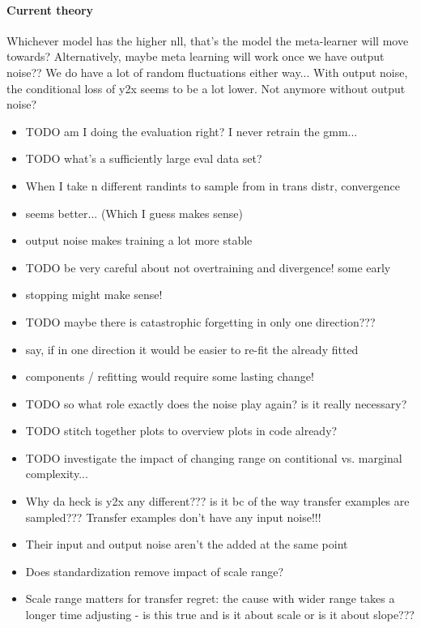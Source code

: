 \documentclass{article}
\begin{document}
\paragraph{Current theory}
Whichever model has the higher nll, that's the model the meta-learner will move towards?
Alternatively, maybe meta learning will work once we have output noise??
We do have a lot of random fluctuations either way...
With output noise, the conditional loss of y2x seems to be a lot lower. Not anymore without output noise?
\begin{itemize}
    \item TODO am I doing the evaluation right? I never retrain the gmm...
    \item TODO what's a sufficiently large eval data set?
    \item When I take n different randints to sample from in trans distr, convergence 
    \item seems better... (Which I guess makes sense)
    \item output noise makes training a lot more stable
    \item TODO be very careful about not overtraining and divergence! some early 
    \item stopping might make sense!
    \item TODO maybe there is catastrophic forgetting in only one direction???
    \item say, if in one direction it would be easier to re-fit the already fitted 
    \item components / refitting would require some lasting change!
    \item TODO so what role exactly does the noise play again? is it really necessary?
    \item TODO stitch together plots to overview plots in code already?
    \item TODO investigate the impact of changing range on contitional vs. marginal complexity...
    \item Why da heck is y2x any different??? is it bc of the way transfer examples are sampled??? Transfer examples don't have any input noise!!!
    \item Their input and output noise aren't the added at the same point
    \item Does standardization remove impact of scale range?
    \item Scale range matters for transfer regret: the cause with wider range takes a longer time adjusting - is this true and is it about scale or is it about slope???

\end{itemize}
\end{document}
